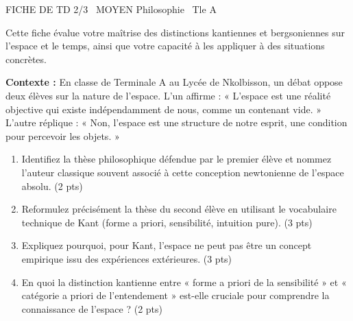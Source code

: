 \documentclass[11pt]{article}
\begin{document}
\begin{tcolorbox}[enhanced,colback=popink,colframe=popink,arc=10pt,boxrule=0pt,left=12pt,right=12pt,top=9pt,bottom=9pt]
{\color{white}\popxbold\small FICHE DE TD 2/3 \textbullet\ MOYEN \hfill Philosophie \textbullet\ Tle A\par}
\end{tcolorbox}
\vspace{4pt}
Cette fiche évalue votre maîtrise des distinctions kantiennes et bergsoniennes sur l'espace et le temps, ainsi que votre capacité à les appliquer à des situations concrètes.

\begin{exercice}
\textbf{Contexte :} En classe de Terminale A au Lycée de Nkolbisson, un débat oppose deux élèves sur la nature de l'espace. L'un affirme : « L'espace est une réalité objective qui existe indépendamment de nous, comme un contenant vide. » L'autre réplique : « Non, l'espace est une structure de notre esprit, une condition pour percevoir les objets. »
\begin{enumerate}
    \item Identifiez la thèse philosophique défendue par le premier élève et nommez l'auteur classique souvent associé à cette conception newtonienne de l'espace absolu. (2 pts)
    \item Reformulez précisément la thèse du second élève en utilisant le vocabulaire technique de Kant (forme a priori, sensibilité, intuition pure). (3 pts)
    \item Expliquez pourquoi, pour Kant, l'espace ne peut pas être un concept empirique issu des expériences extérieures. (3 pts)
    \item En quoi la distinction kantienne entre « forme a priori de la sensibilité » et « catégorie a priori de l'entendement » est-elle cruciale pour comprendre la connaissance de l'espace ? (2 pts)
\end{enumerate}
\end{exercice}
\end{document}
